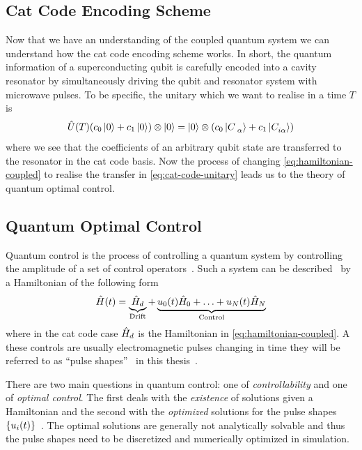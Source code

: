 \documentclass[main.tex]{subfiles}
\begin{document}
\subsection{Cat Code Encoding Scheme}
Now that we have an understanding of the coupled quantum system we can understand how the cat code encoding scheme works.
In short, the quantum information of a superconducting qubit is carefully encoded into a cavity resonator by simultaneously driving the qubit and resonator system with microwave pulses.
To be specific, the unitary which we want to realise in a time \(T\) is
\begin{equation}
    \hat{U}(T) \qty(c_0\ket{0}+c_1\ket{0})\otimes\ket{0} = \ket{0}\otimes\qty(c_0\cat{}+c_1\cat[i]{})
    \label{eq:cat-code-unitary}
\end{equation}
where we see that the coefficients of an arbitrary qubit state are transferred to the resonator in the cat code basis.
Now the process of changing \cref{eq:hamiltonian-coupled} to realise the transfer in \cref{eq:cat-code-unitary} leads us to the theory of quantum optimal control.

\subsection{Quantum Optimal Control}
Quantum control is the process of controlling a quantum system by controlling the amplitude of a set of control operators~\cite{fisher_optimal_2010}.
Such a system can be described~\cite{fisher_optimal_2010} by a Hamiltonian of the following form
\begin{equation}
    \hat{H}(t) = \underbrace{\hat{H}_d}_{\text{Drift}} + \underbrace{u_0(t)\hat{H}_0 + \dotsc + u_N(t)\hat{H}_N}_{\text{Control}}
    \label{eq:optimal-control-hamiltonian}
\end{equation}
where in the cat code case \(\hat{H}_d\) is the Hamiltonian in \cref{eq:hamiltonian-coupled}.
A these controls are usually electromagnetic pulses changing in time they will be referred to as ``pulse shapes''~\cite{fisher_optimal_2010} in this thesis~.

There are two main questions in quantum control: one of \emph{controllability} and one of \emph{optimal control}.
The first deals with the \emph{existence} of solutions given a Hamiltonian and the second with the \emph{optimized} solutions for the pulse shapes \(\qty{u_i(t)}\)~\cite{dalessandro_introduction_2007}.
The optimal solutions are generally not analytically solvable and thus the pulse shapes need to be discretized and numerically optimized in simulation.
\end{document}
